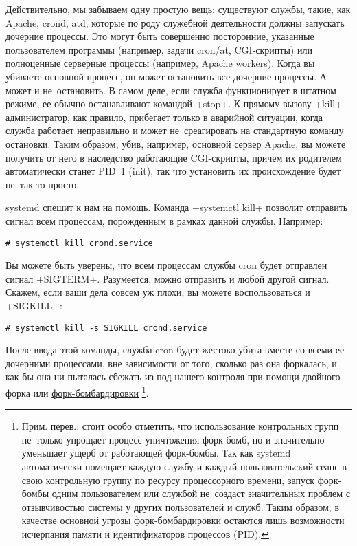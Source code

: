 \documentclass[10pt,oneside,a4paper]{article}
\begin{document}
Действительно, мы забываем одну простую вещь: существуют службы, такие, как
Apache, crond, atd, которые по роду служебной деятельности должны запускать
дочерние процессы. Это могут быть совершенно посторонние, указанные
пользователем программы (например, задачи cron/at, CGI-скрипты) или полноценные
серверные процессы (например, Apache workers). Когда вы убиваете основной
процесс, он может остановить все дочерние процессы. А может и не~остановить. В
самом деле, если служба функционирует в штатном режиме, ее обычно останавливают
командой +stop+. К прямому вызову +kill+ администратор, как правило,
прибегает только в аварийной ситуации, когда служба работает неправильно и
может не~среагировать на стандартную команду остановки. Таким образом, убив,
например, основной сервер Apache, вы можете получить от него в наследство
работающие CGI-скрипты, причем их родителем автоматически станет PID~1 (init),
так что установить их происхождение будет не~так-то просто. 

\href{http://www.freedesktop.org/wiki/Software/systemd}{systemd} спешит к нам
на помощь. Команда +systemctl kill+ позволит отправить сигнал всем
процессам, порожденным в рамках данной службы. Например: 

\begin{Verbatim}
# systemctl kill crond.service
\end{Verbatim}

Вы можете быть уверены, что всем процессам службы cron будет отправлен сигнал
+SIGTERM+. Разумеется, можно отправить и любой другой сигнал. Скажем, если ваши
дела совсем уж плохи, вы можете воспользоваться и +SIGKILL+: 

\begin{Verbatim}
# systemctl kill -s SIGKILL crond.service
\end{Verbatim}

После ввода этой команды, служба cron будет жестоко убита вместе со всеми ее
дочерними процессами, вне зависимости от того, сколько раз она форкалась, и
как бы она ни пыталась сбежать из-под нашего контроля при помощи двойного
форка или
\href{http://ru.wikipedia.org/wiki/Fork-%D0%B1%D0%BE%D0%BC%D0%B1%D0%B0}{форк-бомбардировки}%
\footnote{Прим. перев.: стоит особо отметить, что использование контрольных
групп не~только упрощает процесс уничтожения форк-бомб, но и значительно
уменьшает ущерб от работающей форк-бомбы. Так как systemd автоматически
помещает каждую службу и каждый пользовательский сеанс в свою контрольную
группу по ресурсу процессорного времени, запуск форк-бомбы одним
пользователем или службой не~создаст значительных проблем с отзывчивостью
системы у других пользователей и служб. Таким образом, в качестве основной
угрозы форк-бомбардировки остаются лишь возможности исчерпания памяти и
идентификаторов процессов (PID).}.
\end{document}
